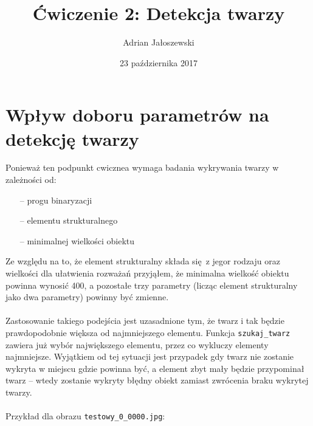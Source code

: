 \documentclass[a4paper, 12pt, titlepage]{article}
\author{Adrian Jałoszewski}
\title{Ćwiczenie 2: Detekcja twarzy}
\date{23 października 2017}
\begin{document}
    \maketitle
    \section{Wpływ doboru parametrów na detekcję twarzy}
        Ponieważ ten podpunkt cwicznea wymaga badania wykrywania twarzy w
        zależności od:
        \begin{itemize}
            \item[--] progu binaryzacji
            \item[--] elementu strukturalnego
            \item[--] minimalnej wielkości obiektu
        \end{itemize}
        Ze względu na to, że element strukturalny składa się z jegor rodzaju 
        oraz wielkości dla ułatwienia rozważań przyjąłem, że minimalna wielkość
        obiektu powinna wynosić 400, a pozostałe trzy parametry (licząc element
        strukturalny jako dwa parametry) powinny być zmienne.
        \\ \\
        Zastosowanie takiego podejścia jest uzasadnione tym, że twarz i tak
        będzie prawdopodobnie większa od najmniejszego elementu. Funkcja
        \texttt{szukaj\_twarz} zawiera już wybór największego elementu, przez 
        co wykluczy elementy najmniejsze. Wyjątkiem od tej sytuacji jest
        przypadek gdy twarz nie zostanie wykryta w miejscu gdzie powinna być, 
        a element zbyt mały będzie przypominał twarz -- wtedy zostanie wykryty
        błędny obiekt zamiast zwrócenia braku wykrytej twarzy.
        \\ \\
        Przykład dla obrazu \texttt{testowy\_0\_0000.jpg}:
\end{document}
